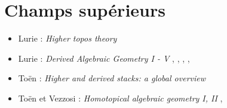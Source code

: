 \section{Champs supérieurs}
\label{section-higher-stacks}

\begin{itemize}
\item Lurie : \emph{Higher topos theory} \cite{lurie_topos}
\item Lurie : \emph{Derived Algebraic Geometry I - V}
\cite{dag1}, \cite{dag2}, \cite{dag3}, \cite{dag4}, \cite{dag5}
\item To\"en : \emph{Higher and derived stacks: a global overview}
\cite{toen_higher}
\item To\"en et Vezzosi : \emph{Homotopical algebraic geometry I, II}
\cite{hag1}, \cite{hag2}
\end{itemize}








